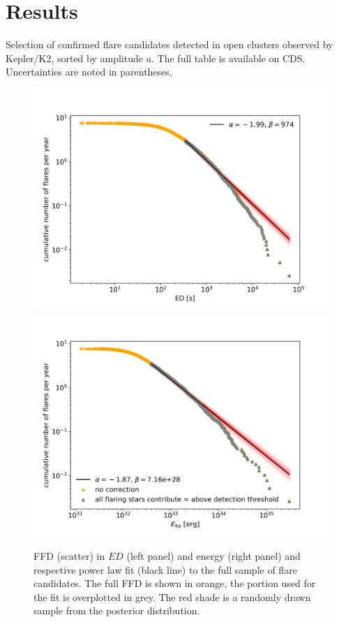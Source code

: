 \documentclass{aa}
\begin{document}
\section{Results}

\begin{table}
\caption{Selection of confirmed flare candidates detected in open clusters observed by Kepler/K2, sorted by amplitude $a$. The full table is available on CDS.  Uncertainties are noted in parentheses.}\label{flares}
\centering
\footnotesize

\end{table}




\begin{figure}
    \centering
    \includegraphics[width=0.49\hsize]{pics/FFDs/full_sample_ffd_ED_wheatland.png}
    \hspace{.01cm}
    \includegraphics[width=0.49\hsize]{pics/FFDs/full_sample_ffd_energy_wheatland.png}
    \caption{FFD (scatter) in $ED$ (left panel) and energy (right panel) and respective power law fit (black line) to the full sample of flare candidates. The full FFD is shown in orange, the portion used for the fit is overplotted in grey. The red shade is a randomly drawn sample from the posterior distribution.}          	
    \label{fig:powerlawfit_full}
\end{figure}
\end{document}
